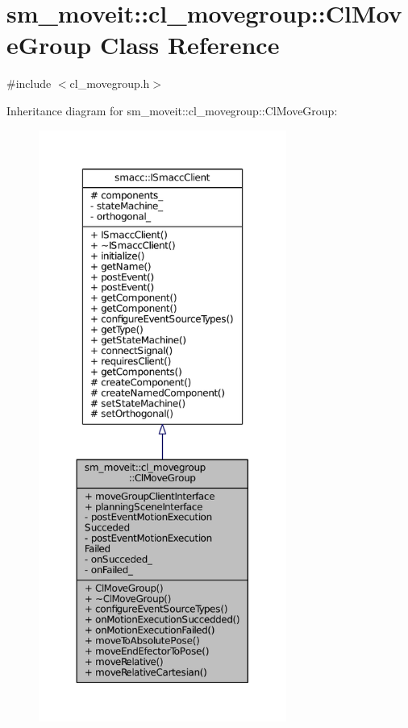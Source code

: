 \hypertarget{classsm__moveit_1_1cl__movegroup_1_1ClMoveGroup}{}\section{sm\+\_\+moveit\+:\+:cl\+\_\+movegroup\+:\+:Cl\+Move\+Group Class Reference}
\label{classsm__moveit_1_1cl__movegroup_1_1ClMoveGroup}


{\ttfamily \#include $<$cl\+\_\+movegroup.\+h$>$}



Inheritance diagram for sm\+\_\+moveit\+:\+:cl\+\_\+movegroup\+:\+:Cl\+Move\+Group\+:
\nopagebreak
\begin{figure}[H]
\begin{center}
\leavevmode
\includegraphics[height=550pt]{classsm__moveit_1_1cl__movegroup_1_1ClMoveGroup__inherit__graph}
\end{center}
\end{figure}


